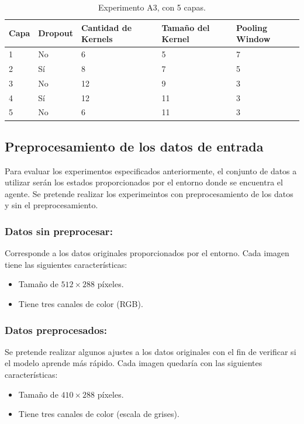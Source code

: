 \documentclass[journal]{IEEEtran}
\begin{document}
        \begin{table}[h!]
            \centering
            \begin{tabular}{@{}lllll@{}}
                \toprule
                Capa & Dropout & Cantidad de Kernels & Tamaño del Kernel & Pooling Window \\ \midrule
                1    & No      & 6                   & 5                 & 7              \\
                2    & Sí      & 8                   & 7                 & 5              \\
                3    & No      & 12                  & 9                 & 3              \\
                4    & Sí      & 12                  & 11                & 3              \\
                5    & No      & 6                   & 11                & 3              \\ \bottomrule
            \end{tabular}
            \caption{Experimento A3, con 5 capas.\label{tab:A3}}
            \end{table}
            
            
\subsection{Preprocesamiento de los datos de entrada}
    Para evaluar los experimentos especificados anteriormente, el conjunto de datos a utilizar serán los estados proporcionados por el entorno donde se encuentra el agente. Se pretende realizar los experimeintos con preprocesamiento de los datos y sin el preprocesamiento.

    \subsubsection{Datos sin preprocesar:} Corresponde a los datos originales proporcionados por el entorno. Cada imagen tiene las siguientes características:
    \begin{itemize}
        \item Tamaño de $512\times288$ píxeles.
        \item Tiene tres canales de color (RGB).
    \end{itemize}

    \subsubsection{Datos preprocesados:} Se pretende realizar algunos ajustes a los datos originales con el fin de verificar si el modelo aprende más rápido. Cada imagen quedaría con las siguientes características:
    \begin{itemize}
        \item Tamaño de $410\times288$ píxeles.
        \item Tiene tres canales de color (escala de grises).
    \end{itemize}
\end{document}
